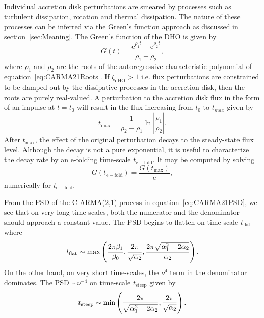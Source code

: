 \documentclass[a4paper,fleqn,usenatbib]{mnras}
\begin{document}
Individual accretion disk perturbations are smeared by processes such as turbulent dissipation, rotation and thermal dissipation. The nature of these processes can be inferred via the Green's function approach as discussed in section~\ref{sec:Meaning}. The Green's function of the DHO is given by
\begin{equation}\label{eq:DHOGFunc}
G(t) = \frac{\mathrm{e}^{\rho_{1}t} - \mathrm{e}^{\rho_{2}t}}{\rho_{1} - \rho_{2}},
\end{equation}
where $\rho_{1}$ and $\rho_{2}$ are the roots of the autoregressive characteristic polynomial of equation~\eqref{eq:CARMA21Roots}. If $\zeta_{\mathrm{dHO}} > 1$ i.e. flux perturbations are constrained to be damped out by the dissipative processes in the accretion disk, then the roots are purely real-valued. A perturbation to the accretion disk flux in the form of an impulse at $t = t_{0}$ will result in the flux increasing from $t_{0}$ to $t_{max}$ given by
\begin{equation}\label{eq:maxT}
t_{\mathrm{max}} = \frac{1}{\rho_{2} - \rho_{1}} \ln \left| \frac{\rho_{1}}{\rho_{2}} \right|.
\end{equation}
After $t_{\mathrm{max}}$, the effect of the original perturbation decays to the steady-state flux level. Although the decay is not a pure exponential, it is useful to characterize the decay rate by an e-folding time-scale $t_{\mathrm{e-fold}}$. It may be computed by solving
\begin{equation}\label{eq:TEFold}
G(t_{\mathrm{e-fold}}) = \frac{G(t_{\mathrm{max}})}{\mathrm{e}},
\end{equation} 
numerically for $t_{\mathrm{e-fold}}$.

From the PSD of the C-ARMA($2$,$1$) process in equation~\eqref{eq:CARMA21PSD}, we see that on very long time-scales, both the numerator and the denominator should approach a constant value. The PSD begins to flatten on time-scale $t_{\mathrm{flat}}$ where 
\begin{equation}\label{eq:TFLAT}
t_{\mathrm{flat}} \sim \max \left( \frac{2\pi \beta_{1}}{\beta_{0}},\frac{2\pi}{\sqrt{\alpha_{2}}},\frac{2\pi \sqrt{\alpha_{1}^{2}-2\alpha_{2}}}{\alpha_{2}} \right).
\end{equation}
On the other hand, on very short time-scales, the $\nu^{4}$ term in the denominator dominates. The PSD $\sim \nu^{-4}$ on time-scale $t_{\mathrm{steep}}$ given by
\begin{equation}\label{eq:STEEP}
t_{\mathrm{steep}} \sim \min \left( \frac{2\pi}{\sqrt{\alpha_{1}^{2} - 2\alpha_{2}}}, \frac{2\pi}{\sqrt{\alpha_{2}}}  \right).
\end{equation}
\end{document}
